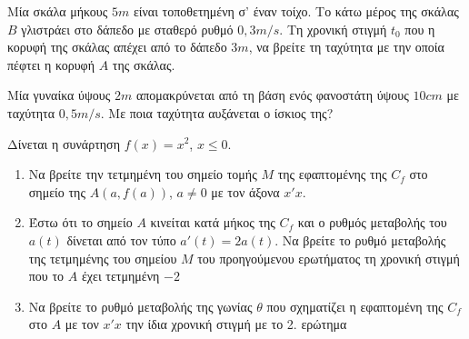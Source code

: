 \documentclass{presentation}
\begin{document}
\begin{askisi}
  Μία σκάλα μήκους $5m$ είναι τοποθετημένη σ' έναν τοίχο. Το κάτω μέρος της σκάλας $Β$ γλιστράει στο δάπεδο με σταθερό ρυθμό $0,3m/s$. Τη χρονική στιγμή $t_0$ που η κορυφή της σκάλας απέχει από το δάπεδο $3m$, να βρείτε τη ταχύτητα με την οποία πέφτει η κορυφή $Α$ της σκάλας.

\end{askisi}

\begin{askisi}
  Μία γυναίκα ύψους $2m$ απομακρύνεται από τη βάση ενός φανοστάτη ύψους $10cm$ με ταχύτητα $0,5m/s$. Με ποια ταχύτητα αυξάνεται ο ίσκιος της?

\end{askisi}

\begin{askisi}
  Δίνεται η συνάρτηση $f(x)=x^2$, $x\le 0$.
  \begin{enumerate}
    \item<1-> Να βρείτε την τετμημένη του σημείο τομής $Μ$ της εφαπτομένης της $C_f$ στο σημείο της $Α(a,f(a))$, $a\ne 0$ με τον άξονα $x'x$.
    \item<2-> Έστω ότι το σημείο $Α$ κινείται κατά μήκος της $C_f$ και ο ρυθμός μεταβολής του $a(t)$ δίνεται από τον τύπο $a'(t)=2a(t)$. Να βρείτε το ρυθμό μεταβολής της τετμημένης του σημείου $Μ$ του προηγούμενου ερωτήματος τη χρονική στιγμή που το $Α$ έχει τετμημένη $-2$
    \item<3-> Να βρείτε το ρυθμό μεταβολής της γωνίας $θ$ που σχηματίζει η εφαπτομένη της $C_f$ στο $Α$ με τον $x'x$ την ίδια χρονική στιγμή με το 2. ερώτημα
  \end{enumerate}

\end{askisi}
\end{document}
